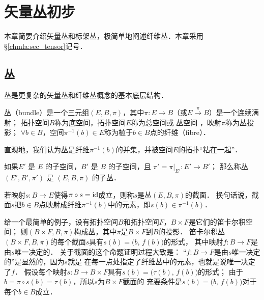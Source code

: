 
\chapter{矢量丛初步}\label{chfb}

本章简要介绍矢量丛和标架丛，极简单地阐述纤维丛．本章采用\S\ref{chmla:sec_tensor}记号．


\section{丛}
丛是更复杂的矢量丛和纤维丛概念的基本底层结构．

\begin{definition}
    {\heiti 丛}（bundle）是一个三元组$(E, B, \pi)$，其中$\pi: E\to B$（或$E\xrightarrow{\pi} B$）是一个连续满射；
    拓扑空间$B$称为{\heiti 底空间}，拓扑空间$E$称为{\heiti 总空间}或 {\heiti 丛空间} ，映射$\pi$称为{\heiti 丛投影}；
    $\forall b\in B$，空间$\pi^{-1}(b)\in E$称为植于$ b\in B$点的{\heiti 纤维}（fibre）．
\end{definition}
直观地，我们认为丛是纤维$\pi^{-1}(b)$的并集，并被空间$E$的拓扑“粘在一起”．


\begin{definition}
     如果$E'$ 是 $E$ 的子空间，$B'$ 是 $B$ 的子空间，且 $ \pi' = \pi |_{E'}: E'\to B'$；
     那么称丛 $(E',  B',\pi')$ 是 $(E, B,\pi)$ 的{\heiti 子丛}．
\end{definition}

\begin{definition}
    若映射$s: B\to E$使得$\pi \circ s = {\rm id}$成立，则称$s$是丛$(E, B,\pi)$的{\heiti 截面}．
    换句话说，截面$s$把$b\in B$点映射成纤维$\pi^{-1}(b)$中的元素，即$s(b)\in \pi^{-1}(b)$．
\end{definition}
    


给一个最简单的例子，设有拓扑空间$B$和拓扑空间$F$，$B\times F$是它们的笛卡尔积空间；
则$(B\times F, B,\pi)$构成丛，其中$\pi$是$B\times F$到$B$的投影．
笛卡尔积丛$(B \times F, B,\pi)$的每个截面$s$具有$s(b) = \bigl(b,\, f(b)\bigr)$的形式，
其中映射$f: B\to F$是由$s$唯一决定的．
关于截面的这个命题证明过程大致是：
“$f: B\to F$是由$s$唯一决定的”是显然的，因为$s$就是
在每一点处指定了纤维丛中的元素，也就是说唯一决定了$f$．
假设每个映射$s: B\to B\times F$具有$s(b) = \bigl(\tau(b), \, f (b)\bigr)$的形式；
由于$b=\pi \circ s(b) = \tau(b)$，所以$s$为$B\times F$截面的
充要条件是$s(b) = \bigl(b,\, f(b)\bigr)$对于每个$b\in B$成立．

